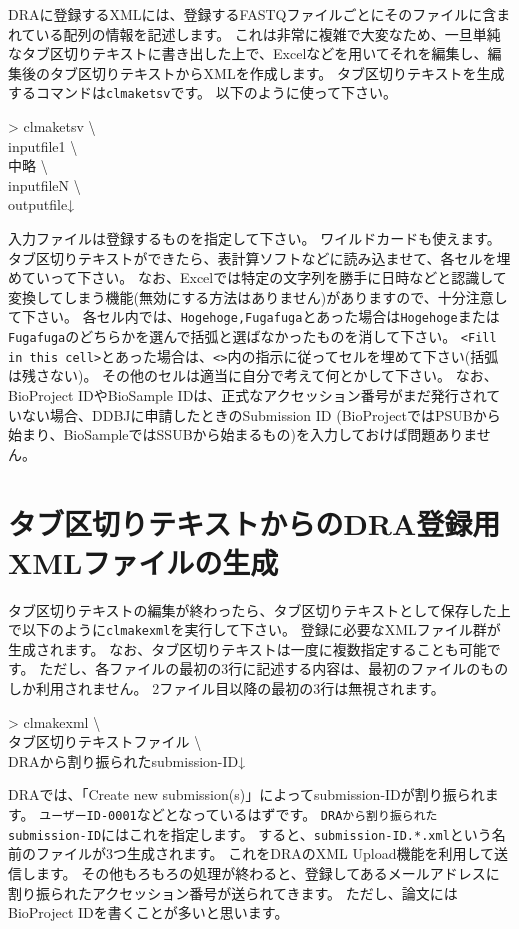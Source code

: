 \documentclass[titlepage,10pt,a4paper,english]{jsbook}
\newenvironment{cmd}{\begin{oframed}\raggedright\ttfamily\footnotesize\setlength{\baselineskip}{1.4em}}{\end{oframed}\vspace{-1em}}
\begin{document}
DRAに登録するXMLには、登録するFASTQファイルごとにそのファイルに含まれている配列の情報を記述します。
これは非常に複雑で大変なため、一旦単純なタブ区切りテキストに書き出した上で、Excelなどを用いてそれを編集し、編集後のタブ区切りテキストからXMLを作成します。
タブ区切りテキストを生成するコマンドは\texttt{clmaketsv}です。
以下のように使って下さい。
\begin{cmd}
{\textgreater} clmaketsv {\textbackslash}\\
inputfile1 {\textbackslash}\\
中略 {\textbackslash}\\
inputfileN {\textbackslash}\\
outputfile↓
\end{cmd}
入力ファイルは登録するものを指定して下さい。
ワイルドカードも使えます。
タブ区切りテキストができたら、表計算ソフトなどに読み込ませて、各セルを埋めていって下さい。
なお、Excelでは特定の文字列を勝手に日時などと認識して変換してしまう機能(無効にする方法はありません)がありますので、十分注意して下さい。
各セル内では、\texttt{{\lbrack}Hogehoge,Fugafuga{\rbrack}}とあった場合は\texttt{Hogehoge}または\texttt{Fugafuga}のどちらかを選んで括弧と選ばなかったものを消して下さい。
\texttt{{\textless}Fill in this cell{\textgreater}}とあった場合は、\texttt{{\textless}{\textgreater}}内の指示に従ってセルを埋めて下さい(括弧は残さない)。
その他のセルは適当に自分で考えて何とかして下さい。
なお、BioProject IDやBioSample IDは、正式なアクセッション番号がまだ発行されていない場合、DDBJに申請したときのSubmission ID (BioProjectではPSUBから始まり、BioSampleではSSUBから始まるもの)を入力しておけば問題ありません。

\section{タブ区切りテキストからのDRA登録用XMLファイルの生成}

タブ区切りテキストの編集が終わったら、タブ区切りテキストとして保存した上で以下のように\texttt{clmakexml}を実行して下さい。
登録に必要なXMLファイル群が生成されます。
なお、タブ区切りテキストは一度に複数指定することも可能です。
ただし、各ファイルの最初の3行に記述する内容は、最初のファイルのものしか利用されません。
2ファイル目以降の最初の3行は無視されます。
\begin{cmd}
{\textgreater} clmakexml {\textbackslash}\\
タブ区切りテキストファイル {\textbackslash}\\
DRAから割り振られたsubmission-ID↓
\end{cmd}
DRAでは、「Create new submission(s)」によってsubmission-IDが割り振られます。
\texttt{ユーザーID-0001}などとなっているはずです。
\texttt{DRAから割り振られたsubmission-ID}にはこれを指定します。
すると、\texttt{submission-ID.*.xml}という名前のファイルが3つ生成されます。
これをDRAのXML Upload機能を利用して送信します。
その他もろもろの処理が終わると、登録してあるメールアドレスに割り振られたアクセッション番号が送られてきます。
ただし、論文にはBioProject IDを書くことが多いと思います。
\end{document}
